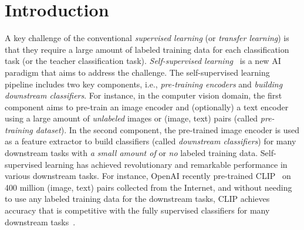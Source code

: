 \section{Introduction}
A key challenge of the conventional \emph{supervised learning} (or \emph{transfer learning}) is that they require a large amount of labeled training data for each classification task (or the teacher classification task). 
\emph{Self-supervised learning}~\cite{devlin2018bert,hadsell2006dimensionality,he2020momentum,chen2020simple,hjelm2018learning,grill2020bootstrap} is a new AI paradigm that aims to address the challenge. The self-supervised learning pipeline includes two key components, i.e., \emph{pre-training encoders} and \emph{building downstream classifiers}. 
For instance,  in the computer vision domain, the first component
 aims to pre-train an image encoder and (optionally) a text encoder using a large amount of \emph{unlabeled} images or (image, text) pairs (called \emph{pre-training dataset}). In the second component, the pre-trained image encoder is used as a feature extractor to build classifiers (called \emph{downstream classifiers}) for many downstream tasks with \emph{a small amount of} or \emph{no} labeled training data. %
 Self-supervised learning has achieved revolutionary and remarkable performance in various downstream tasks. For instance, OpenAI recently pre-trained CLIP~\cite{radford2021learning} on 400 million (image, text) pairs collected from the Internet, and without needing to use any labeled training data for the downstream  tasks, CLIP achieves accuracy that is competitive with the fully supervised classifiers for many downstream  tasks~\cite{radford2021learning}. 
 

 




